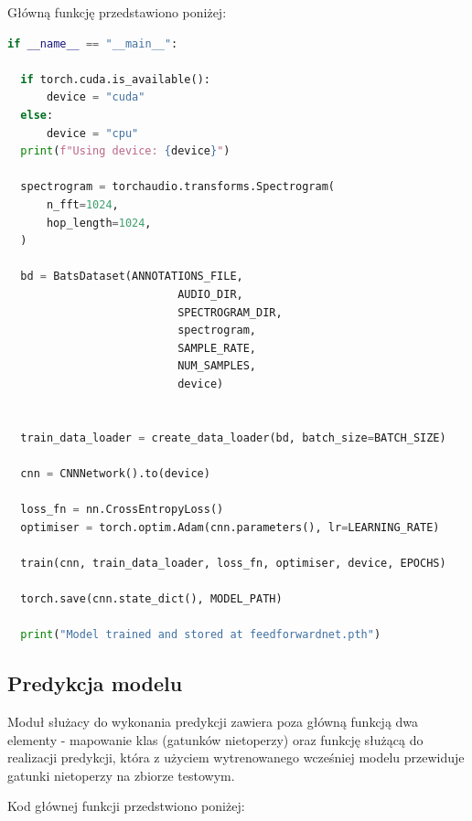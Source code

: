 \documentclass{sprz}
\begin{document}
Główną funkcję przedstawiono poniżej:

\begin{lstlisting}[language=Python,caption={Implementacja modułu do trenowania sieci}, label={lst:train}]
  if __name__ == "__main__":

  if torch.cuda.is_available():
      device = "cuda"
  else:
      device = "cpu"
  print(f"Using device: {device}")

  spectrogram = torchaudio.transforms.Spectrogram(
      n_fft=1024,
      hop_length=1024,
  )

  bd = BatsDataset(ANNOTATIONS_FILE,
                          AUDIO_DIR,
                          SPECTROGRAM_DIR, 
                          spectrogram, 
                          SAMPLE_RATE,
                          NUM_SAMPLES,
                          device)


  train_data_loader = create_data_loader(bd, batch_size=BATCH_SIZE)

  cnn = CNNNetwork().to(device)

  loss_fn = nn.CrossEntropyLoss()
  optimiser = torch.optim.Adam(cnn.parameters(), lr=LEARNING_RATE)

  train(cnn, train_data_loader, loss_fn, optimiser, device, EPOCHS)

  torch.save(cnn.state_dict(), MODEL_PATH)

  print("Model trained and stored at feedforwardnet.pth")
\end{lstlisting}

\subsection{Predykcja modelu}
Moduł służacy do wykonania predykcji zawiera poza główną funkcją dwa elementy - mapowanie klas (gatunków nietoperzy) oraz funkcję służącą do realizacji predykcji, która z użyciem wytrenowanego wcześniej modelu przewiduje gatunki nietoperzy na zbiorze testowym.

Kod głównej funkcji przedstwiono poniżej:
\end{document}
